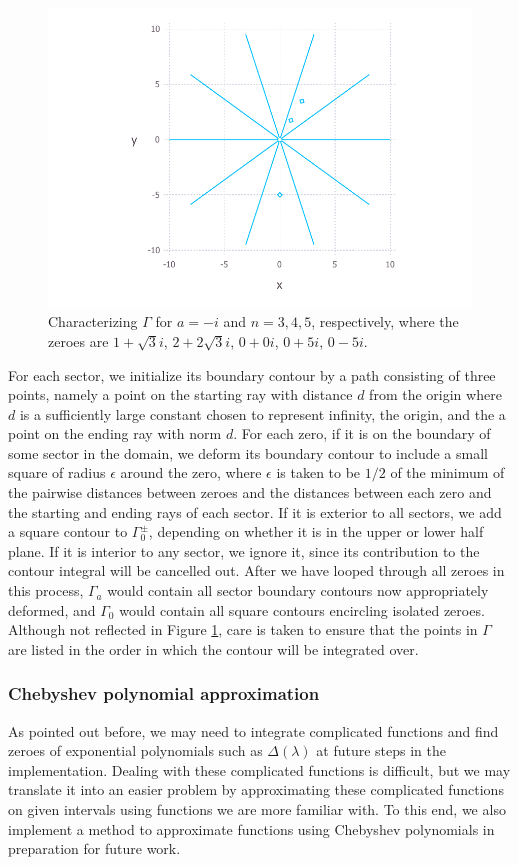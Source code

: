 \documentclass[11pt, oneside, a4paper]{article}
\begin{document}
\begin{figure}[htpb!]
      \includegraphics[width=\linewidth]{contourPlot3.pdf}
    \endminipage
    \caption{Characterizing $\Gamma$ for $a=-i$ and $n=3, 4, 5$, respectively, where the zeroes are $1+\sqrt{3}i$, $2+2\sqrt{3}i$, $0+0i$, $0+5i$, $0-5i$.}
    \label{fig:contourPlot}
\end{figure}

For each sector, we initialize its boundary contour by a path consisting of three points, namely a point on the starting ray with distance $d$ from the origin where $d$ is a sufficiently large constant chosen to represent infinity, the origin, and the a point on the ending ray with norm $d$. For each zero, if it is on the boundary of some sector in the domain, we deform its boundary contour to include a small square of radius $\epsilon$ around the zero, where $\epsilon$ is taken to be $1/2$ of the minimum of the pairwise distances between zeroes and the distances between each zero and the starting and ending rays of each sector. If it is exterior to all sectors, we add a square contour to $\Gamma_0^{\pm}$, depending on whether it is in the upper or lower half plane. If it is interior to any sector, we ignore it, since its contribution to the contour integral will be cancelled out. After we have looped through all zeroes in this process, $\Gamma_a$ would contain all sector boundary contours now appropriately deformed, and $\Gamma_0$ would contain all square contours encircling isolated zeroes. Although not reflected in Figure \ref{fig:contourPlot}, care is taken to ensure that the points in $\Gamma$ are listed in the order in which the contour will be integrated over. 

\subsubsection{Chebyshev polynomial approximation}
As pointed out before, we may need to integrate complicated functions and find zeroes of exponential polynomials such as $\Delta(\lambda)$ at future steps in the implementation. Dealing with these complicated functions is difficult, but we may translate it into an easier problem by approximating these complicated functions on given intervals using functions we are more familiar with. To this end, we also implement a method to approximate functions using Chebyshev polynomials in preparation for future work.
\end{document}
